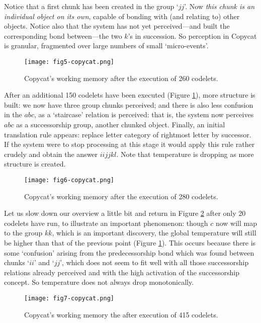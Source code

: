 \documentclass[a4paper]{article}
\begin{document}
Notice that a first chunk has been created in the group `$jj$'.  Now \emph{this chunk is an individual object on its own}, capable of bonding with (and relating to) other objects. Notice also that the system has not yet perceived---and built the corresponding bond between---the two $k$'s in succession. So perception in Copycat is granular, fragmented over large numbers of small `micro-events'.

\begin{figure}
\centering
\texttt{[image: fig5-copycat.png]}
\caption{\label{fig:run-2}Copycat’s working memory after the execution of 260 codelets.}
\end{figure}


After an additional 150 codelets have been executed (Figure \ref{fig:run-2}), more structure is built:  we now have three group chunks perceived; and there is also less confusion in the $abc$, as a `staircase' relation is perceived: that is, the system now perceives $abc$ as a successorship group, another chunked object. Finally, an initial translation rule appears: replace letter category of rightmost letter by successor. If the system were to stop processing at this stage it would apply this rule rather crudely and obtain the answer $iijjkl$.  Note that temperature is dropping as more structure is created.

\begin{figure}
\centering
\texttt{[image: fig6-copycat.png]}
\caption{\label{fig:run-3}Copycat’s working memory after the execution of 280 codelets. }
\end{figure}


Let us slow down our overview a little bit and return in Figure \ref{fig:run-3} after only 20 codelets have run, to illustrate an important phenomenon: though $c$ now will map to the group $kk$, which is an important discovery, the global temperature will still be higher than that of the previous point (Figure \ref{fig:run-2}).  This occurs because there is some `confusion' arising from the predecessorship bond which was found between chunks `$ii$' and `$jj$', which does not seem to fit well with all those successorship relations already perceived and with the high activation of the successorship concept.  So temperature does not always drop monotonically.


\begin{figure}
\centering
\texttt{[image: fig7-copycat.png]}
\caption{\label{fig:frog}Copycat's working memory the after execution of 415 codelets.}
\end{figure}
\end{document}
